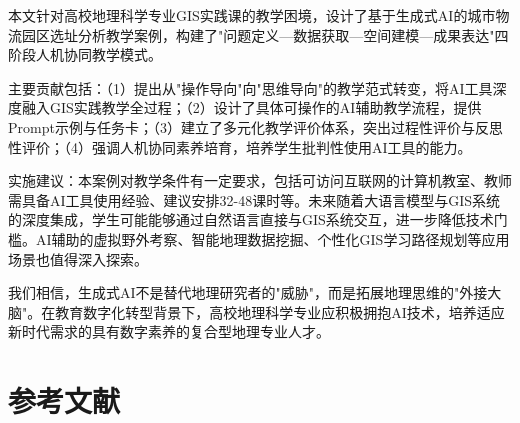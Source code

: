 \documentclass[12pt, a4paper]{article}
\begin{document}
本文针对高校地理科学专业GIS实践课的教学困境，设计了基于生成式AI的城市物流园区选址分析教学案例，构建了"问题定义—数据获取—空间建模—成果表达"四阶段人机协同教学模式。

主要贡献包括：（1）提出从"操作导向"向"思维导向"的教学范式转变，将AI工具深度融入GIS实践教学全过程；（2）设计了具体可操作的AI辅助教学流程，提供Prompt示例与任务卡；（3）建立了多元化教学评价体系，突出过程性评价与反思性评价；（4）强调人机协同素养培育，培养学生批判性使用AI工具的能力。

实施建议：本案例对教学条件有一定要求，包括可访问互联网的计算机教室、教师需具备AI工具使用经验、建议安排32-48课时等。未来随着大语言模型与GIS系统的深度集成\citep{gai2023}，学生可能能够通过自然语言直接与GIS系统交互，进一步降低技术门槛。AI辅助的虚拟野外考察、智能地理数据挖掘、个性化GIS学习路径规划等应用场景也值得深入探索。

我们相信，生成式AI不是替代地理研究者的"威胁"，而是拓展地理思维的"外接大脑"。在教育数字化转型背景下，高校地理科学专业应积极拥抱AI技术，培养适应新时代需求的具有数字素养的复合型地理专业人才。

\newpage

\section{参考文献}
\end{document}
